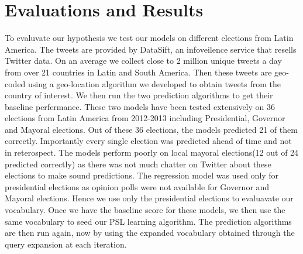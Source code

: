 \chapter{Evaluations and Results}
To evaluvate our hypothesis we test our models on different elections from Latin America.
The tweets are provided by DataSift, an infoveilence service that resells Twitter data.
On an average we collect close to 2 million unique tweets a day from over 21 countries in Latin and South America.
Then these tweets are geo-coded using a geo-location algorithm we developed to obtain tweets from the country of interest.
We then run the two prediction algorithms to get their baseline perfermance.
These two models have been tested extensively on 36 elections from Latin America from 2012-2013 including Presidential, Governor and Mayoral elections. 
Out of these 36 elections, the models predicted 21 of them correctly. 
Importantly every single election was predicted ahead of time and not in reterospect.
The models perform poorly on local mayoral elections(12 out of 24 predicted correctly) as there was not much chatter on Twitter about these elections to make sound predictions. 
The regression model was used only for presidential elections as opinion polls were not available for Governor and Mayoral elections.
Hence we use only the presidential elections to evaluavate our vocabulary.
Once we have the baseline score for these models, we then use the same vocabulary to seed our PSL learning algorithm. 
The prediction algorithms are then run again, now by using the expanded vocabulary obtained through the query expansion at each iteration.

